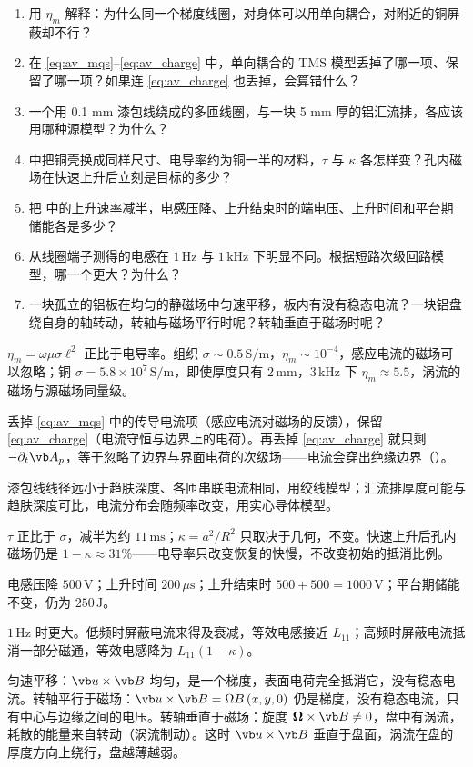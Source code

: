 \begin{selfcheck}
\begin{enumerate}
\item 用 $\eta_m$ 解释：为什么同一个梯度线圈，对身体可以用单向耦合，对附近的铜屏蔽却不行？
\item 在 \eqref{eq:av_mqs}--\eqref{eq:av_charge} 中，单向耦合的 TMS 模型丢掉了哪一项、保留了哪一项？如果连 \eqref{eq:av_charge} 也丢掉，会算错什么？
\item 一个用 0.1 mm 漆包线绕成的多匝线圈，与一块 5 mm 厚的铝汇流排，各应该用哪种源模型？为什么？
\item {} 中把铜壳换成同样尺寸、电导率约为铜一半的材料，$\tau$ 与 $\kappa$ 各怎样变？孔内磁场在快速上升后立刻是目标的多少？
\item 把 中的上升速率减半，电感压降、上升结束时的端电压、上升时间和平台期储能各是多少？
\item 从线圈端子测得的电感在 $1\,\mathrm{Hz}$ 与 $1\,\mathrm{kHz}$ 下明显不同。根据短路次级回路模型，哪一个更大？为什么？
\item 一块孤立的铝板在均匀的静磁场中匀速平移，板内有没有稳态电流？一块铝盘绕自身的轴转动，转轴与磁场平行时呢？转轴垂直于磁场时呢？
\end{enumerate}
\end{selfcheck}

\begin{answers}
\item $\eta_m=\omega\mu\sigma\ell^2$ 正比于电导率。组织 $\sigma\sim0.5\,\mathrm{S/m}$，$\eta_m\sim10^{-4}$，感应电流的磁场可以忽略；铜 $\sigma=5.8\times10^7\,\mathrm{S/m}$，即使厚度只有 $2\,\mathrm{mm}$，$3\,\mathrm{kHz}$ 下 $\eta_m\approx5.5$，涡流的磁场与源磁场同量级。
\item 丢掉 \eqref{eq:av_mqs} 中的传导电流项（感应电流对磁场的反馈），保留 \eqref{eq:av_charge}（电流守恒与边界上的电荷）。再丢掉 \eqref{eq:av_charge} 就只剩 $-\partial_t\vb A_p$，等于忽略了边界与界面电荷的次级场——电流会穿出绝缘边界（）。
\item 漆包线线径远小于趋肤深度、各匝串联电流相同，用绞线模型；汇流排厚度可能与趋肤深度可比，电流分布会随频率改变，用实心导体模型。
\item $\tau$ 正比于 $\sigma$，减半为约 $11\,\mathrm{ms}$；$\kappa=a^2/R^2$ 只取决于几何，不变。快速上升后孔内磁场仍是 $1-\kappa\approx31\%$——电导率只改变恢复的快慢，不改变初始的抵消比例。
\item 电感压降 $500\,\mathrm V$；上升时间 $200\,\mu\mathrm s$；上升结束时 $500+500=1000\,\mathrm V$；平台期储能不变，仍为 $250\,\mathrm J$。
\item $1\,\mathrm{Hz}$ 时更大。低频时屏蔽电流来得及衰减，等效电感接近 $L_{11}$；高频时屏蔽电流抵消一部分磁通，等效电感降为 $L_{11}(1-\kappa)$。
\item 匀速平移：$\vb u\times\vb B$ 均匀，是一个梯度，表面电荷完全抵消它，没有稳态电流。转轴平行于磁场：$\vb u\times\vb B=\Omega B\,(x,y,0)$ 仍是梯度，没有稳态电流，只有中心与边缘之间的电压。转轴垂直于磁场：旋度 $\boldsymbol\Omega\times\vb B\neq0$，盘中有涡流，耗散的能量来自转动（涡流制动）。这时 $\vb u\times\vb B$ 垂直于盘面，涡流在盘的厚度方向上绕行，盘越薄越弱。
\end{answers}
